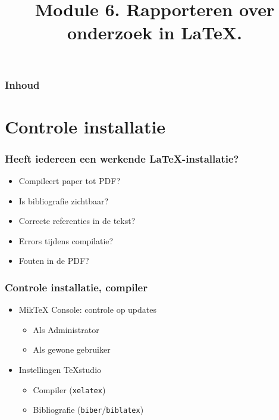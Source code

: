 \documentclass[aspectratio=169]{beamer}
\title{Module 6. Rapporteren over onderzoek in \LaTeX{}.}
\subtitle{\coursename}
\author{\lecturers}   %
\date{\academicyear}
\begin{document}
\begin{frame}
  \maketitle
\end{frame}

\begin{frame}
  \frametitle{Inhoud}

  \tableofcontents
\end{frame}

\section{Controle installatie}

\begin{frame}[plain]
  \frametitle{Heeft iedereen een werkende {\LaTeX}-installatie?}

  \begin{itemize}
    \item Compileert paper tot PDF?
    \item Is bibliografie zichtbaar?
    \item Correcte referenties in de tekst?
    \item Errors tijdens compilatie?
    \item Fouten in de PDF?
  \end{itemize}

  \bigskip


\end{frame}


\begin{frame}
  \frametitle{Controle installatie, compiler}

  \begin{itemize}
    \item Mik{\TeX} Console: controle op updates
          \begin{itemize}
            \item Als Administrator
            \item Als gewone gebruiker
          \end{itemize}
    \item Instellingen TeXstudio
          \begin{itemize}
            \item Compiler (\texttt{xelatex})
            \item Bibliografie (\texttt{biber}/\texttt{biblatex})
          \end{itemize}
  \end{itemize}

\end{frame}
\end{document}
